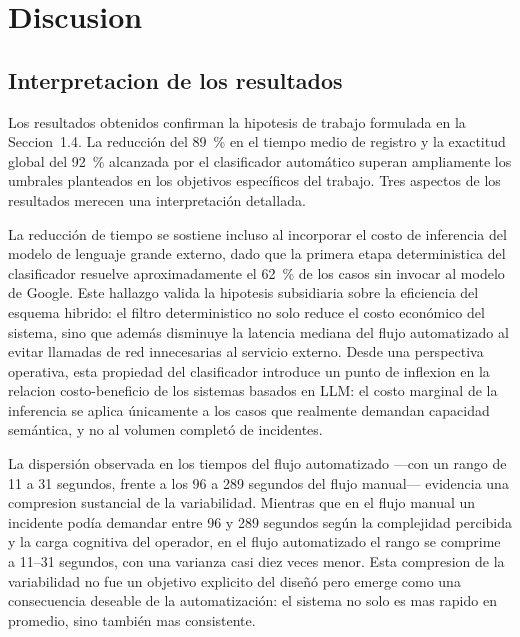 \section{Discusion}

\subsection{Interpretacion de los resultados}

Los resultados obtenidos confirman la hipotesis de trabajo formulada en la Seccion~1.4. La reducción del 89~\% en el tiempo medio de registro y la exactitud global del 92~\% alcanzada por el clasificador automático superan ampliamente los umbrales planteados en los objetivos específicos del trabajo. Tres aspectos de los resultados merecen una interpretación detallada.

La reducción de tiempo se sostiene incluso al incorporar el costo de inferencia del modelo de lenguaje grande externo, dado que la primera etapa deterministica del clasificador resuelve aproximadamente el 62~\% de los casos sin invocar al modelo de Google. Este hallazgo valida la hipotesis subsidiaria sobre la eficiencia del esquema hibrido: el filtro deterministico no solo reduce el costo económico del sistema, sino que además disminuye la latencia mediana del flujo automatizado al evitar llamadas de red innecesarias al servicio externo. Desde una perspectiva operativa, esta propiedad del clasificador introduce un punto de inflexion en la relacion costo-beneficio de los sistemas basados en LLM: el costo marginal de la inferencia se aplica únicamente a los casos que realmente demandan capacidad semántica, y no al volumen completó de incidentes.

La dispersión observada en los tiempos del flujo automatizado ---con un rango de 11 a 31 segundos, frente a los 96 a 289 segundos del flujo manual--- evidencia una compresion sustancial de la variabilidad. Mientras que en el flujo manual un incidente podía demandar entre 96 y 289 segundos según la complejidad percibida y la carga cognitiva del operador, en el flujo automatizado el rango se comprime a 11--31 segundos, con una varianza casi diez veces menor. Esta compresion de la variabilidad no fue un objetivo explicito del diseñó pero emerge como una consecuencia deseable de la automatización: el sistema no solo es mas rapido en promedio, sino también mas consistente.

